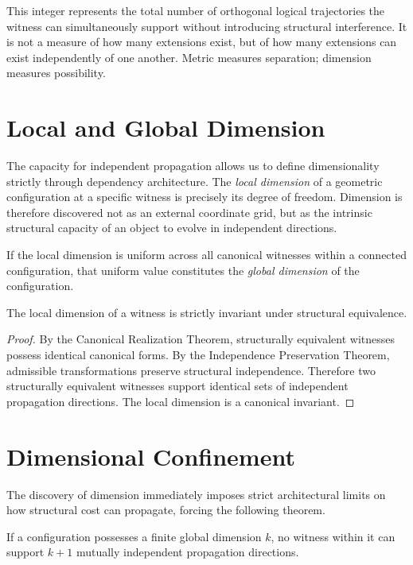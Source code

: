 \documentclass[12pt,anyside]{book}
\newcommand{\term}[1]{\textit{#1}}             %
\begin{document}
This integer represents the total number of orthogonal logical trajectories the witness can simultaneously support without introducing structural interference. It is not a measure of how many extensions exist, but of how many extensions can exist independently of one another. Metric measures separation; dimension measures possibility.

\section{Local and Global Dimension}
The capacity for independent propagation allows us to define dimensionality strictly through dependency architecture. The \term{local dimension} of a geometric configuration at a specific witness is precisely its degree of freedom. Dimension is therefore discovered not as an external coordinate grid, but as the intrinsic structural capacity of an object to evolve in independent directions.

If the local dimension is uniform across all canonical witnesses within a connected configuration, that uniform value constitutes the \term{global dimension} of the configuration. 

\begin{theorem}
The local dimension of a witness is strictly invariant under structural equivalence.
\end{theorem}

\begin{proof}
By the Canonical Realization Theorem, structurally equivalent witnesses possess identical canonical forms. By the Independence Preservation Theorem, admissible transformations preserve structural independence. Therefore two structurally equivalent witnesses support identical sets of independent propagation directions. The local dimension is a canonical invariant.
\end{proof}

\section{Dimensional Confinement}
The discovery of dimension immediately imposes strict architectural limits on how structural cost can propagate, forcing the following theorem.

\begin{theorem}
If a configuration possesses a finite global dimension $k$, no witness within it can support $k+1$ mutually independent propagation directions.
\end{theorem}
\end{document}
